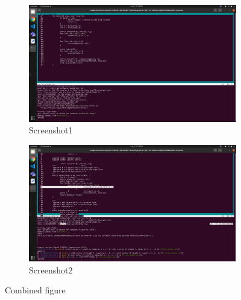 \documentclass{article}
\begin{document}
\begin{figure}
\centering
\begin{subfigure}{0.49\textwidth}
\centering
\includegraphics[width = \textwidth]{Screenshot1.png}
\caption{Screenshot1}
\label{fig:left}
\end{subfigure}
\begin{subfigure}{0.49\textwidth}
\centering
\includegraphics[width = \textwidth]{Screenshot2.png}
\caption{Screenshot2}
\label{fig:right}
\end{subfigure}
\caption{Combined figure}
\label{fig:combined}
\end{figure}
\clearpage
\end{document}
